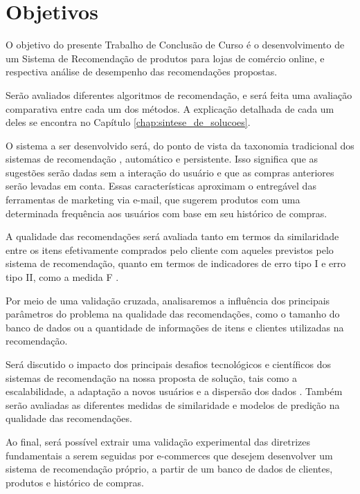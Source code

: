 \chapter[Objetivos]{Objetivos}
\label{chap:objetivos}

O objetivo do presente Trabalho de Conclusão de Curso é o desenvolvimento de um Sistema de Recomendação de produtos para lojas de comércio online, e respectiva análise de desempenho das recomendações propostas. 

Serão avaliados diferentes algoritmos de recomendação, e será feita uma avaliação comparativa entre cada um dos métodos. A explicação detalhada de cada um deles se encontra no Capítulo \ref{chap:sintese_de_solucoes}.

O sistema a ser desenvolvido será, do ponto de vista da taxonomia tradicional dos sistemas de recomendação \cite{schafer1999recommender}, automático e persistente. Isso significa que as sugestões serão dadas sem a interação do usuário e que as compras anteriores serão levadas em conta. Essas características aproximam o entregável das ferramentas de marketing via e-mail, que sugerem produtos com uma determinada frequência aos usuários com base em seu histórico de compras. 

A qualidade das recomendações será avaliada tanto em termos da similaridade entre os itens efetivamente comprados pelo cliente com aqueles previstos pelo sistema de recomendação, quanto em termos de indicadores de erro tipo I e erro tipo II, como a medida F \cite{sarwar2000analysis}. 

Por meio de uma validação cruzada, analisaremos a influência dos principais parâmetros do problema na qualidade das recomendações, como o tamanho do banco de dados ou a quantidade de informações de itens e clientes utilizadas na recomendação. 

Será discutido o impacto dos principais desafios tecnológicos e científicos dos sistemas de recomendação na nossa proposta de solução, tais como a escalabilidade, a adaptação a novos usuários e a dispersão dos dados \cite{wei2007survey}. Também serão avaliadas as diferentes medidas de similaridade e modelos de predição na qualidade das recomendações. 

Ao final, será possível extrair uma validação experimental das diretrizes fundamentais a serem seguidas por e-commerces que desejem desenvolver um sistema de recomendação próprio, a partir de um banco de dados de clientes, produtos e histórico de compras. 